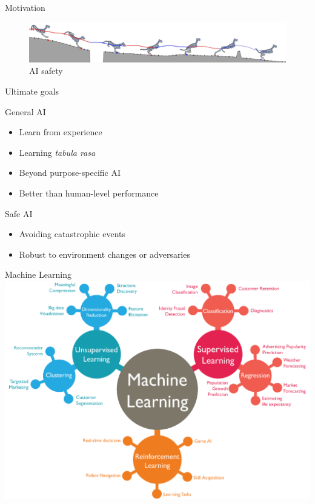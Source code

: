 \documentclass{beamer}
\begin{document}
\begin{frame}{Motivation}
\begin{figure}
\includegraphics[width=\linewidth]{../gfx/running_tiger.png}
\caption{AI safety}
\end{figure}
\end{frame}

\begin{frame}{Ultimate goals}

\begin{block}{General AI}
\begin{itemize}
\item Learn from experience
\item Learning \textit{tabula rasa}
\item Beyond purpose-specific AI
\item Better than human-level performance
\end{itemize}
\end{block}

\begin{block}{Safe AI}
\begin{itemize}
\item Avoiding catastrophic events
\item Robust to environment changes or adversaries
\end{itemize}
\end{block}

\end{frame}


\begin{frame}{Machine Learning}
\center
\includegraphics[width=.8\linewidth]{../gfx/ml_diagram.png}


\end{frame}
\end{document}
